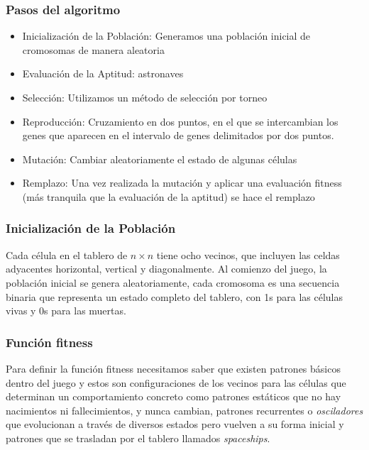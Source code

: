 \subsubsection*{Pasos del algoritmo}

\begin{itemize}
    \item Inicialización de la Población: Generamos una población inicial de cromosomas de 
    manera aleatoria
    \item Evaluación de la Aptitud: astronaves
    \item Selección: Utilizamos un método de selección por torneo
    \item Reproducción: Cruzamiento en dos puntos, en el que se intercambian los genes que 
    aparecen en el intervalo de genes delimitados por dos puntos.
    \item Mutación: Cambiar aleatoriamente el estado de algunas células
    \item Remplazo: Una vez realizada la mutación y aplicar una evaluación fitness (más 
    tranquila que la evaluación de la aptitud) se hace el remplazo
\end{itemize}


\subsubsection*{Inicialización de la Población}

Cada célula en el tablero de $n \times n$ tiene ocho vecinos, que incluyen las celdas 
adyacentes horizontal, vertical y diagonalmente. Al comienzo del juego, la población inicial 
se genera aleatoriamente, cada cromosoma es una secuencia binaria que representa un estado 
completo del tablero, con 1s para las células vivas y 0s para las muertas.

\subsubsection*{Función fitness}

Para definir la función fitness necesitamos saber que existen patrones básicos dentro del 
juego y estos son configuraciones de los vecinos para las células que determinan un 
comportamiento concreto como patrones estáticos que no hay nacimientos ni fallecimientos,
y nunca cambian, patrones recurrentes o \textit{osciladores} que evolucionan a través de 
diversos estados pero vuelven a su forma inicial y patrones que se trasladan por el tablero
llamados \textit{spaceships}.\\ 

